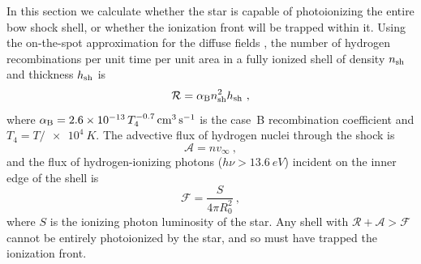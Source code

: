 In this section we calculate whether the star is capable of
photoionizing the entire bow shock shell, or whether the ionization
front will be trapped within it.  Using the on-the-spot approximation
for the diffuse fields \citep{Osterbrock:2006a}, the number of
hydrogen recombinations per unit time per unit area in a fully ionized
shell of density \(n\shell\) and thickness \(h\shell\) is
\begin{equation}
  \label{eq:shell-recombination-rate}
  \mathcal{R} = \alphaB n\shell^2 h\shell \ ,
\end{equation}
where \(\alphaB = \num{2.6e-13}\, T_4^{-0.7}\, \si{cm^3.s^{-1}}\) is
the case~B recombination coefficient and \(T_4 = T/\SI{e4}{K}\).
The advective flux of hydrogen nuclei through the shock is
\begin{equation}
  \label{eq:shell-advective-flux}
  \mathcal{A} = n v_\infty \ ,
\end{equation}
and the flux of hydrogen-ionizing photons
(\(h \nu > \SI{13.6}{eV}\)) incident on the inner edge of the shell is
\begin{equation}
  \label{eq:shell-ionizing-flux}
  \mathcal{F} = \frac{S} {4 \pi R_0^2} \ , 
\end{equation}
where \(S\) is the ionizing photon luminosity of the star.  Any shell
with \(\mathcal{R} + \mathcal{A} > \mathcal{F}\) cannot be entirely
photoionized by the star, and so must have trapped the ionization
front.

